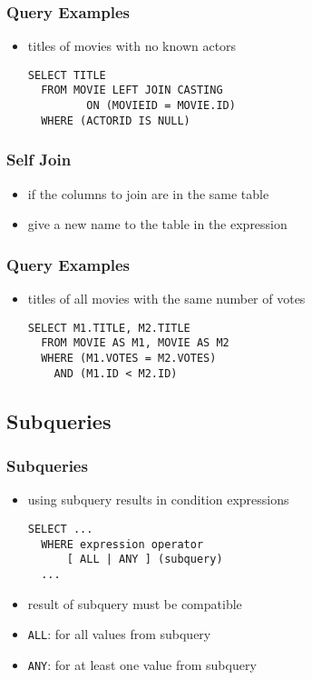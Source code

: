 \documentclass[dvipsnames]{beamer}
\theoremstyle{plain}
\begin{document}
\begin{frame}[fragile]
  \frametitle{Query Examples}

  \begin{itemize}
    \item titles of movies with no known actors
    \begin{lstlisting}
SELECT TITLE
  FROM MOVIE LEFT JOIN CASTING
         ON (MOVIEID = MOVIE.ID)
  WHERE (ACTORID IS NULL)
    \end{lstlisting}
  \end{itemize}
\end{frame}

\begin{frame}[fragile]
  \frametitle{Self Join}

  \begin{itemize}
    \item if the columns to join are in the same table
    \item give a new name to the table in the expression
  \end{itemize}
\end{frame}

\begin{frame}[fragile]
  \frametitle{Query Examples}

  \begin{itemize}
    \item titles of all movies with the same number of votes

    \medskip
    \lstinline!SELECT M1.TITLE, M2.TITLE!\\
    \lstinline!  FROM MOVIE AS M1, MOVIE AS M2!\\
    \lstinline!  WHERE (M1.VOTES = M2.VOTES)!\\
    \pause
    \lstinline!    AND (M1.ID < M2.ID)!
  \end{itemize}
\end{frame}

\subsection{Subqueries}

\begin{frame}[fragile]
  \frametitle{Subqueries}

  \begin{itemize}
    \item using subquery results in condition expressions
    \begin{lstlisting}
SELECT ...
  WHERE expression operator
      [ ALL | ANY ] (subquery)
  ...
    \end{lstlisting}

    \item result of subquery must be compatible
    \item \lstinline!ALL!: for all values from subquery
    \item \lstinline!ANY!: for at least one value from subquery
  \end{itemize}
\end{frame}
\end{document}
